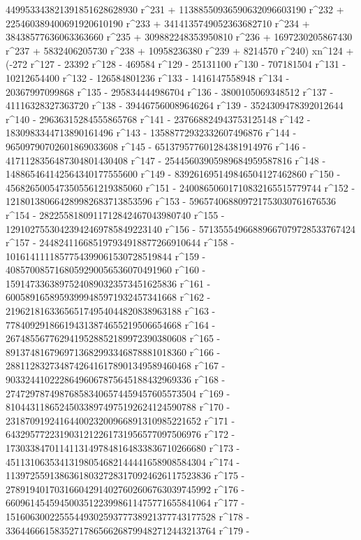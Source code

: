        449953343821391851628628930 r^231 + 
       11388550936590632096603190 r^232 + 
       225460389400691920610190 r^233 + 
       3414135749052363682710 r^234 + 38438577636063363660 r^235 + 
       309882248353950810 r^236 + 1697230205867430 r^237 + 
       5832406205730 r^238 + 10958236380 r^239 + 
       8214570 r^240) xn^124 + (-272 r^127 - 23392 r^128 - 
       469584 r^129 - 25131100 r^130 - 707181504 r^131 - 
       10212654400 r^132 - 126584801236 r^133 - 1416147558948 r^134 - 
       20367997099868 r^135 - 295834444986704 r^136 - 
       3800105069348512 r^137 - 41116328327363720 r^138 - 
       394467560089646264 r^139 - 3524309478392012644 r^140 - 
       29636315284555865768 r^141 - 237668824943753125148 r^142 - 
       1830983344713890161496 r^143 - 13588772932332607496876 r^144 - 
       96509790702601869033608 r^145 - 
       651379577601284381914976 r^146 - 
       4171128356487304801430408 r^147 - 
       25445603905989684959587816 r^148 - 
       148865464142564340177555600 r^149 - 
       839261695149846504127462860 r^150 - 
       4568265005473505561219385060 r^151 - 
       24008650601710832165515779744 r^152 - 
       121801380664289982683713853596 r^153 - 
       596574068809721753030761676536 r^154 - 
       2822558180911712842467043980740 r^155 - 
       12910275530423942469785849223140 r^156 - 
       57135554966889667079728533767424 r^157 - 
       244824116685197934918877266910644 r^158 - 
       1016141111857754399061530728519844 r^159 - 
       4085700857168059290056536070491960 r^160 - 
       15914733638975240890323573451625836 r^161 - 
       60058916589593999485971932457341668 r^162 - 
       219621816336565174954044820838963188 r^163 - 
       778409291866194313874655219506654668 r^164 - 
       2674855677629419528852189972390380608 r^165 - 
       8913748167969713682993346878881018360 r^166 - 
       28811283273487426416178901349589460468 r^167 - 
       90332441022286496067875645188432969336 r^168 - 
       274729787498768583406574459457605573504 r^169 - 
       810443118652450338974975192624124590788 r^170 - 
       2318709192416440023200966891310985221652 r^171 - 
       6432957722319031212261731956577097506976 r^172 - 
       17303384701141131497848164833836710266680 r^173 - 
       45113106353413198054682144441658908584304 r^174 - 
       113972559138636180327283170924626117523836 r^175 - 
       278919401703166042914027602606763039745992 r^176 - 
       660961454594500351223998611475771655841064 r^177 - 
       1516063002255544930259377738921377743177528 r^178 - 
       3364466615835271786566268799482712443213764 r^179 - 
